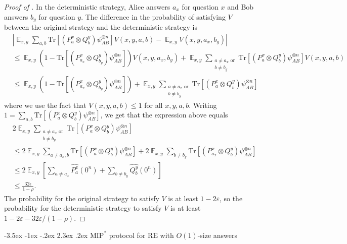 \documentclass[10pt,a4paper]{article}
\makeatletter
\renewcommand{\section}{\@startsection {section}{1}{\z@}%
             {-3.5ex \@plus -1ex \@minus -.2ex}%
             {2.3ex \@plus .2ex}%
             {\normalfont\Large\scshape\bfseries}}
\theoremstyle{plain}
\theoremstyle{definition}
\newcommand {\br} [1] {\ensuremath{ \left( #1 \right) }}
\newcommand {\Br} [1] {\ensuremath{ \left[ #1 \right] }}
\DeclareMathOperator*{\bigE}{\mathbb{E}}
\newcommand {\Tr} {\ensuremath{ \mathrm{Tr} }}
\newcommand{\ep} {\ensuremath{\varepsilon}}
\newcommand{\1}{\mathbb{1}} %
\newcommand{\MIP}{\mathrm{MIP}}
\newcommand{\RE}{\mathrm{RE}}
\makeatother
\begin{document}
\begin{proof}[Proof of ]
In the deterministic strategy, Alice answers $a_x$ for question $x$ and Bob answers $b_y$ for question $y$.
The difference in the probability of satisfying $V$ between the original strategy and the deterministic strategy is 
\begin{align*}
    &\left| \bigE_{x,y} \sum_{a,b} \Tr\Br{ \br{P^x_a \otimes Q^y_b} \psi_{AB}^{\otimes n}}V(x,y,a,b) -
    \bigE_{x,y} V(x,y,a_x,b_y)\right| \\
    &\leq \bigE_{x,y} \br{ 1 - \Tr\Br{ \br{P^x_{a_x} \otimes Q^y_{b_y}} \psi_{AB}^{\otimes n}}}V(x,y,a_x,b_y)
    + \bigE_{x,y} \sum_{\substack{a \neq a_x \text{ or}\\ b \neq b_y}}
    \Tr\Br{ \br{P^x_a \otimes Q^y_b} \psi_{AB}^{\otimes n}} V(x,y,a,b) \\
    &\leq \bigE_{x,y} \br{ 1 - \Tr\Br{ \br{P^x_{a_x} \otimes Q^y_{b_y}} \psi_{AB}^{\otimes n}}}
    + \bigE_{x,y} \sum_{\substack{a \neq a_x \text{ or}\\ b \neq b_y}}
    \Tr\Br{ \br{P^x_a \otimes Q^y_b} \psi_{AB}^{\otimes n}}
\end{align*}
where we use the fact that $V(x,y,a,b) \leq 1$ for all $x,y,a,b$.
Writing $1 = \sum_{a,b} \Tr\Br{ \br{P^x_{a} \otimes Q^y_{b}} \psi_{AB}^{\otimes n}}$, we get that the expression above equals
\begin{align*}
    &2 \bigE_{x,y}  \sum_{\substack{a \neq a_x \text{ or}\\ b \neq b_y}}
    \Tr\Br{ \br{P^x_a \otimes Q^y_b} \psi_{AB}^{\otimes n}} \\
    &\leq 2 \bigE_{x,y} \sum_{a \neq a_x,b} \Tr\Br{ \br{P^x_a \otimes Q^y_b} \psi_{AB}^{\otimes n}}
    + 2 \bigE_{x,y} \sum_{b \neq b_y}  \Tr\Br{ \br{P^x_{a_x} \otimes Q^y_b} \psi_{AB}^{\otimes n}} \\
    &\leq 2 \bigE_{x,y} \Br{\sum_{a \neq a_x} \widehat{P^x_a}(0^n) + \sum_{b\neq b_y} \widehat{Q^y_b}(0^n)} \\
    & \leq \frac{32\epsilon}{1-\rho}.
\end{align*}
The probability for the original strategy to satisfy $V$ is at least $1 - 2\ep$, 
so the probability for the deterministic strategy to satisfy $V$ is at least $1 - 2\ep- 32\ep/(1-\rho)$. 
\end{proof}

%
\section{\texorpdfstring{$\MIP^\ast$}{MIP*} protocol for \texorpdfstring{$\RE$}{RE} with \texorpdfstring{$O(1)$}{O(1)}-size answers}
\label{sec:re}
\end{document}
